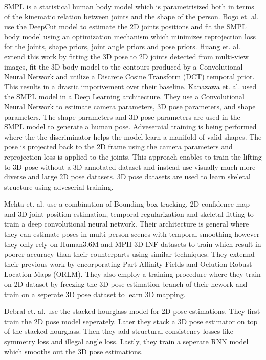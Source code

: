 SMPL \parencite{loper2015smpl} is a statistical human body model which is parametrisized both in terms of the kinematic relation between joints and the shape of the person. Bogo et. al. \parencite{bogo2016keep} use the DeepCut \parencite{pishchulin2016deepcut} model to estimate the 2D joints positions and fit the SMPL body model using an optimization mechanism which minimizes reprojection loss for the joints, shape priors, joint angle priors and pose priors. Huang et. al. extend this work \parencite{huang2017towards} by fitting the 3D pose to 2D joints detected from multi-view images, fit the 3D body model to the contours produced by a Convolutional Neural Network and utilize a Discrete Cosine Transform (DCT) \parencite{akhter2012bilinear} temporal prior. This results in a drastic imporivement over their baseline. Kanazawa et. al. \parencite{kanazawa2017end} used the SMPL model in a Deep Learning architecture. They use a Convolutional Neural Network to estimate camera parameters, 3D pose parameters, and shape parameters. The shape parameters and 3D pose parameters are used in the SMPL model to generate a human pose. Adveseraial training is being performed where the the discriminator helps the model learn a manifold of valid shapes. The pose is projected back to the 2D frame using the camera parameters and reprojection loss is applied to the joints. This approach enables to train the lifting to 3D pose without a 3D annotated dataset and instead use visually much more diverse and large 2D pose datasets. 3D pose datasets are used to learn skeletal structure using adveserial training.   

Mehta et. al. \parencite{mehta2017vnect} use a combination of Bounding box tracking, 2D confidence map and 3D joint position estimation, temporal regularization and skeletal fitting to train a deep convolutional neural network. Their architecture is general where they can estimate poses in multi-person scenes with temporal smoothing however they only rely on Human3.6M and MPII-3D-INF datasets to train which result in poorer accuracy than their counterparts using similar techniques. They extennd their previous work \parencite{mehta2017single} by encorporating Part Affinity Fields \parencite{cao2016realtime} and Oclution Robust Location Maps (ORLM). They also employ a training procedure where they train on 2D dataset by freezing the 3D pose estimation branch of their nework and train on a seperate 3D pose dataset to learn 3D mapping.

Debral et. al. \parencite{dabral2017structure} use the stacked hourglass \parencite{newell2016stacked} model for 2D pose estimations. They first train the 2D pose model seperately. Later they stack a 3D pose estimator on top of the stacked hourglass. Then they add structural consistency losses like symmetry loss and illegal angle loss. Lastly, they train a seperate RNN model which smooths out the 3D pose estimations.
